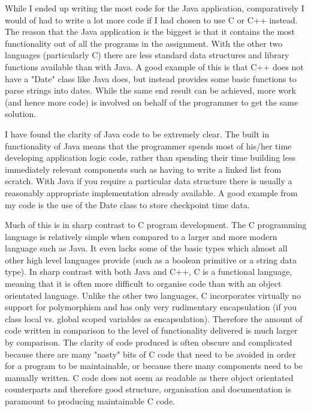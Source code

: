 \documentclass{article}
\begin{document}
While I ended up writing the most code for the Java application, comparatively I would of had to write a lot more code if I had chosen to use C or C++ instead. The reason that the Java application is the biggest is that it contains the most functionality out of all the programs in the assignment. With the other two languages (particularly C) there are less standard data structures and library functions available than with Java. A good example of this is that C++ does not have a "Date" class like Java does, but instead provides some basic functions to parse strings into dates. While the same end result can be achieved, more work (and hence more code) is involved on behalf of the programmer to get the same solution.

I have found the clarity of Java code to be extremely clear. The built in functionality of Java means that the programmer spends most of his/her time developing application logic code, rather than spending their time building less immediately relevant components such as having to write a linked list from scratch. With Java if you require a particular data structure there is usually a reasonably appropriate implementation already available. A good example from my code is the use of the Date class to store checkpoint time data.

Much of this is in sharp contrast to C program development. The C programming language is relatively simple when compared to a larger and more modern language such as Java. It even lacks some of the basic types which almost all other high level languages provide (such as a boolean primitive or a string data type). In sharp contrast with both Java and C++, C is a functional language, meaning that it is often more difficult to organise code than with an object orientated language. Unlike the other two languages, C incorporates virtually no support for polymorphism and has only very rudimentary encapsulation (if you class local vs. global scoped variables as encapsulation). Therefore the amount of code written in comparison to the level of functionality delivered is much larger by comparison. The clarity of code produced is often obscure and complicated because there are many "nasty" bits of C code that need to be avoided in order for a program to be maintainable, or because there many components need to be manually written. C code does not seem as readable as there object orientated counterparts and therefore good structure, organisation and documentation is paramount to producing maintainable C code.
\end{document}
